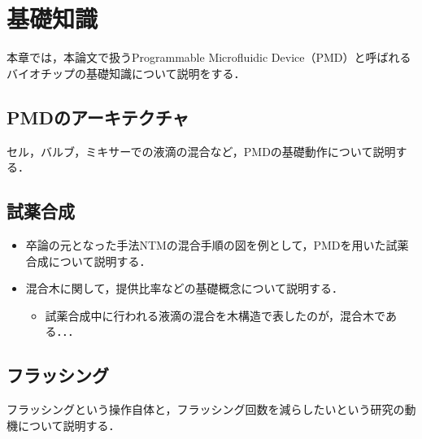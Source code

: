 \chapter{基礎知識}
本章では，本論文で扱うProgrammable Microfluidic Device（PMD）と呼ばれるバイオチップの基礎知識について説明をする．

\section{PMDのアーキテクチャ}
セル，バルブ，ミキサーでの液滴の混合など，PMDの基礎動作について説明する．
\section{試薬合成}
\begin{itemize}
\item 卒論の元となった手法NTMの混合手順の図を例として，PMDを用いた試薬合成について説明する．
\item 混合木に関して，提供比率などの基礎概念について説明する．
\begin{itemize}
\item 試薬合成中に行われる液滴の混合を木構造で表したのが，混合木である．．．
\end{itemize} 
\end{itemize} 
\section{フラッシング}
フラッシングという操作自体と，フラッシング回数を減らしたいという研究の動機について説明する．
 
